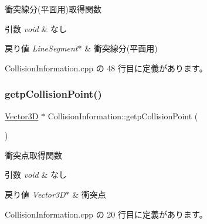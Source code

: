 衝突線分(平面用)取得関数 


\begin{DoxyParams}{引数}
{\em void} & なし \\
\hline
\end{DoxyParams}

\begin{DoxyRetVals}{戻り値}
{\em Line\+Segment$\ast$} & 衝突線分(平面用) \\
\hline
\end{DoxyRetVals}


 Collision\+Information.\+cpp の 48 行目に定義があります。

\mbox{\label{class_collision_information_affce7016429a57e1283c2e3b424d2347}} 
\subsubsection{\texorpdfstring{getp\+Collision\+Point()}{getpCollisionPoint()}}
{\footnotesize\ttfamily \mbox{\hyperlink{class_vector3_d}{Vector3D}} $\ast$ Collision\+Information\+::getp\+Collision\+Point (\begin{DoxyParamCaption}{ }\end{DoxyParamCaption})}



衝突点取得関数 


\begin{DoxyParams}{引数}
{\em void} & なし \\
\hline
\end{DoxyParams}

\begin{DoxyRetVals}{戻り値}
{\em Vector3\+D$\ast$} & 衝突点 \\
\hline
\end{DoxyRetVals}


 Collision\+Information.\+cpp の 20 行目に定義があります。

\mbox{\label{class_collision_information_a4146ab53569d6d52a4af94b21617ddf8}} 
